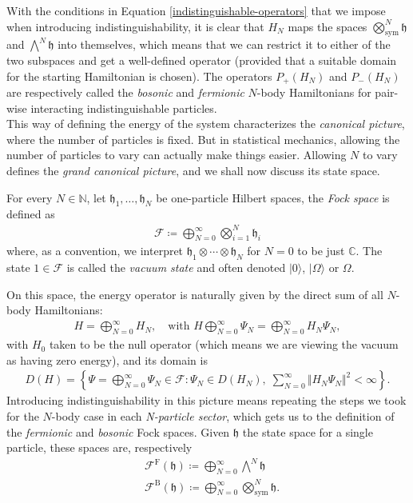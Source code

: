 With the conditions in Equation \eqref{indistinguishable-operators} that we impose when
introducing indistinguishability, it is clear that $H_N$ maps the spaces
$\bigotimes_{\mathrm{sym}}^N\mathfrak{h}$ and $\bigwedge^N\mathfrak{h}$ into themselves, which
means that we can restrict
it to either of the two subspaces and get a well-defined operator (provided that a suitable
domain for the starting Hamiltonian is chosen). The operators $P_+(H_N)$ and $P_-(H_N)$ are
respectively called the \textit{bosonic} and \textit{fermionic} $N$-body Hamiltonians for
pair-wise interacting indistinguishable particles.
\\
This way of defining the energy of the system characterizes the \textit{canonical picture},
where the number of particles is fixed. But in statistical mechanics, allowing the number of
particles to vary can actually make things easier. Allowing $N$ to vary defines the
\textit{grand canonical picture}, and we shall now discuss its state space.

\begin{definition}
	For every $N\in\mathbb{N}$, let $\mathfrak{h}_1,\ldots,\mathfrak{h}_N$ be one-particle
	Hilbert spaces, the \textit{Fock space} is defined as
	\begin{align*}
		\mathcal{F} \coloneq \bigoplus_{N=0}^\infty \bigotimes_{i=1}^N \mathfrak{h}_i
	\end{align*}
	where, as a convention, we interpret $\mathfrak{h}_1\otimes\cdots\otimes\mathfrak{h}_N$
	for $N=0$ to be just $\mathbb{C}$. The state $1\in\mathcal{F}$ is called the
	\textit{vacuum state} and often denoted $|0\rangle$, $|\Omega\rangle$ or $\Omega$.
\end{definition}

On this space, the energy operator is naturally given by the direct sum of all $N$-body
Hamiltonians:
\begin{align*}
	H = \bigoplus_{N=0}^\infty H_N,\quad\text{with }
	H\bigoplus_{N=0}^\infty\Psi_N = \bigoplus_{N=0}^\infty H_N\Psi_N,
\end{align*}
with $H_0$ taken to be the null operator (which means we are viewing the vacuum as having zero
energy), and its domain is
\begin{align*}
	D(H) = \left\{
		\Psi=\bigoplus_{N=0}^\infty\Psi_N \in \mathcal{F} : \Psi_N\in D(H_N),\;
		\sum_{N=0}^\infty\Vert H_N\Psi_N \Vert^2 < \infty
	\right\}.
\end{align*}
Introducing indistinguishability in this picture means repeating the steps we took for the
$N$-body case in each \textit{N-particle sector}, which gets us to the definition of the
\textit{fermionic} and \textit{bosonic} Fock spaces. Given $\mathfrak{h}$ the state space for
a single particle, these spaces are, respectively
\begin{align*}
	&\mathcal{F}^\mathrm{F}(\mathfrak{h}) \coloneq \bigoplus_{N=0}^\infty \bigwedge^N\mathfrak{h}\\
	&\mathcal{F}^\mathrm{B}(\mathfrak{h}) \coloneq \bigoplus_{N=0}^\infty \bigotimes_{\mathrm{sym}}^N\mathfrak{h}.
\end{align*}

